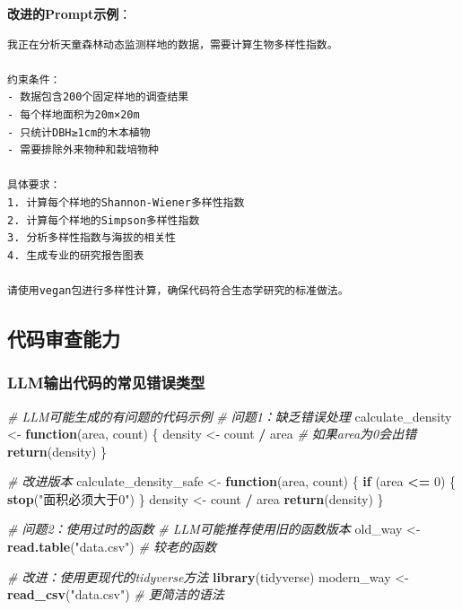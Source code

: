 \documentclass[
]{book}
\newenvironment{Shaded}{\begin{snugshade}}{\end{snugshade}}
\newcommand{\CommentTok}[1]{\textcolor[rgb]{0.56,0.35,0.01}{\textit{#1}}}
\newcommand{\ControlFlowTok}[1]{\textcolor[rgb]{0.13,0.29,0.53}{\textbf{#1}}}
\newcommand{\DecValTok}[1]{\textcolor[rgb]{0.00,0.00,0.81}{#1}}
\newcommand{\FunctionTok}[1]{\textcolor[rgb]{0.13,0.29,0.53}{\textbf{#1}}}
\newcommand{\NormalTok}[1]{#1}
\newcommand{\OtherTok}[1]{\textcolor[rgb]{0.56,0.35,0.01}{#1}}
\newcommand{\SpecialCharTok}[1]{\textcolor[rgb]{0.81,0.36,0.00}{\textbf{#1}}}
\newcommand{\StringTok}[1]{\textcolor[rgb]{0.31,0.60,0.02}{#1}}
\begin{document}
\textbf{改进的Prompt示例}：

\begin{verbatim}
我正在分析天童森林动态监测样地的数据，需要计算生物多样性指数。

约束条件：
- 数据包含200个固定样地的调查结果
- 每个样地面积为20m×20m
- 只统计DBH≥1cm的木本植物
- 需要排除外来物种和栽培物种

具体要求：
1. 计算每个样地的Shannon-Wiener多样性指数
2. 计算每个样地的Simpson多样性指数
3. 分析多样性指数与海拔的相关性
4. 生成专业的研究报告图表

请使用vegan包进行多样性计算，确保代码符合生态学研究的标准做法。
\end{verbatim}

\hypertarget{ux4ee3ux7801ux5ba1ux67e5ux80fdux529b}{%
\subsection{代码审查能力}\label{ux4ee3ux7801ux5ba1ux67e5ux80fdux529b}}

\hypertarget{llmux8f93ux51faux4ee3ux7801ux7684ux5e38ux89c1ux9519ux8befux7c7bux578b}{%
\subsubsection{LLM输出代码的常见错误类型}\label{llmux8f93ux51faux4ee3ux7801ux7684ux5e38ux89c1ux9519ux8befux7c7bux578b}}

\begin{Shaded}
\begin{Highlighting}[]
\CommentTok{\# LLM可能生成的有问题的代码示例}
\CommentTok{\# 问题1：缺乏错误处理}
\NormalTok{calculate\_density }\OtherTok{\textless{}{-}} \ControlFlowTok{function}\NormalTok{(area, count) \{}
\NormalTok{  density }\OtherTok{\textless{}{-}}\NormalTok{ count }\SpecialCharTok{/}\NormalTok{ area  }\CommentTok{\# 如果area为0会出错}
  \FunctionTok{return}\NormalTok{(density)}
\NormalTok{\}}

\CommentTok{\# 改进版本}
\NormalTok{calculate\_density\_safe }\OtherTok{\textless{}{-}} \ControlFlowTok{function}\NormalTok{(area, count) \{}
  \ControlFlowTok{if}\NormalTok{ (area }\SpecialCharTok{\textless{}=} \DecValTok{0}\NormalTok{) \{}
    \FunctionTok{stop}\NormalTok{(}\StringTok{"面积必须大于0"}\NormalTok{)}
\NormalTok{  \}}
\NormalTok{  density }\OtherTok{\textless{}{-}}\NormalTok{ count }\SpecialCharTok{/}\NormalTok{ area}
  \FunctionTok{return}\NormalTok{(density)}
\NormalTok{\}}

\CommentTok{\# 问题2：使用过时的函数}
\CommentTok{\# LLM可能推荐使用旧的函数版本}
\NormalTok{old\_way }\OtherTok{\textless{}{-}} \FunctionTok{read.table}\NormalTok{(}\StringTok{"data.csv"}\NormalTok{)  }\CommentTok{\# 较老的函数}

\CommentTok{\# 改进：使用更现代的tidyverse方法}
\FunctionTok{library}\NormalTok{(tidyverse)}
\NormalTok{modern\_way }\OtherTok{\textless{}{-}} \FunctionTok{read\_csv}\NormalTok{(}\StringTok{"data.csv"}\NormalTok{)  }\CommentTok{\# 更简洁的语法}
\end{Highlighting}
\end{Shaded}
\end{document}
